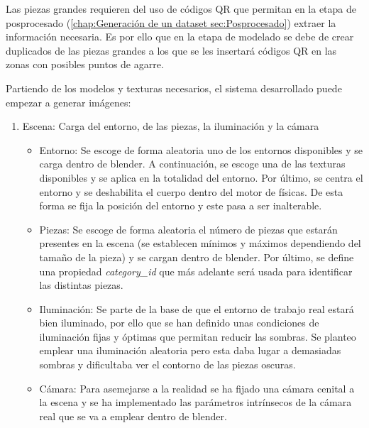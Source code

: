 Las piezas grandes requieren del uso de códigos QR que permitan en la etapa de posprocesado (\ref{chap:Generación de un dataset sec:Posprocesado}) extraer la información necesaria. Es por ello que en la etapa de modelado se debe de crear duplicados de las piezas grandes a los que se les insertará códigos QR en las zonas con posibles puntos de agarre.

Partiendo de los modelos y texturas necesarios, el sistema desarrollado puede empezar a generar imágenes:

\begin{enumerate}
\item Escena: Carga del entorno, de las piezas, la iluminación y la cámara
\begin{itemize}
\item Entorno: Se escoge de forma aleatoria uno de los entornos disponibles y se carga dentro de blender. A continuación, se escoge una de las texturas disponibles y se aplica en la totalidad del entorno. Por último, se centra el entorno y se deshabilita el cuerpo dentro del motor de físicas. De esta forma se fija la posición del entorno y este pasa a ser inalterable.

\item Piezas: Se escoge de forma aleatoria el número de piezas que estarán presentes en la escena (se establecen mínimos y máximos dependiendo del tamaño de la pieza) y se cargan dentro de blender. Por último, se define una propiedad \textit{category\_id} que más adelante será usada para identificar las distintas piezas.

\item Iluminación: Se parte de la base de que el entorno de trabajo real estará bien iluminado, por ello que se han definido unas condiciones de iluminación fijas y óptimas que permitan reducir las sombras. Se planteo emplear una iluminación aleatoria pero esta daba lugar a demasiadas sombras y dificultaba ver el contorno de las piezas oscuras.

\item Cámara: Para asemejarse a la realidad se ha fijado una cámara cenital a la escena y se ha implementado las parámetros intrínsecos de la cámara real que se va a emplear dentro de blender.
\end{itemize}


\end{enumerate}
